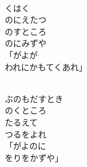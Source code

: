 \documentclass[10pt,b5j]{tarticle} %
\begin{document}
\vspace{1.5em} %
\newcommand{\linespace}{0.5em} %
\newcommand{\blocksize}{0.5\hsize} %
\newcommand{\itemmargin}{3em} %
\begin{enumerate} %
    \setlength{\itemindent}{\itemmargin} %
    \begin{minipage}[c]{\blocksize}
    
        \vspace{\linespace}
        \item~\\
        くはく\\
        のにえたつ\\
        のすところ\\
        のにみずや\\
        「がよが\\
        われにかもてくあれ」
        
    \end{minipage}
    \begin{minipage}[c]{\blocksize}
        
        \vspace{\linespace}
        \item~\\
        ぶのもだすとき\\
        のくところ\\
        たるえて\\
        つるをよれ\\
        「がよのに\\
        をりをかずや」
        
    \end{minipage}
    \begin{minipage}[c]{\blocksize}
        

\end{minipage}
\end{enumerate}
\end{document}
